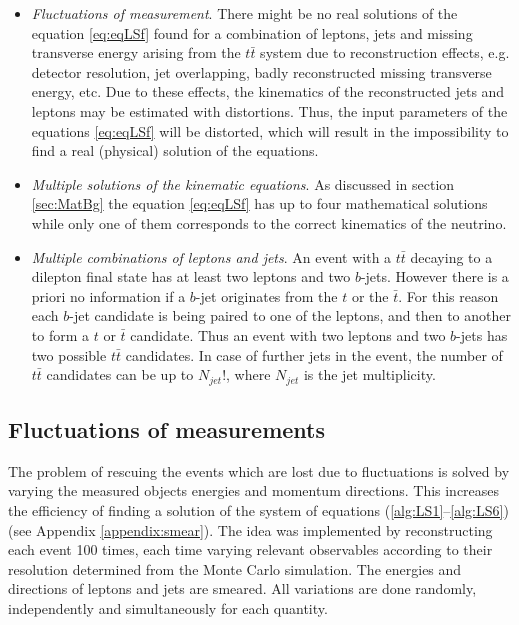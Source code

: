 \begin{itemize}
 \item \textit{Fluctuations of measurement}. There might be no real solutions of the equation \ref{eq:eqLSf} found for a combination
 of leptons, jets and missing transverse energy arising from the $t\bar{t}$ system due to reconstruction effects, e.g. detector resolution,
 jet overlapping, badly reconstructed missing transverse energy, etc. Due to these effects, the kinematics of the reconstructed 
 jets and leptons may be estimated with distortions. Thus, the input parameters of the equations \ref{eq:eqLSf} will be distorted,
 which will result in the impossibility to find a real (physical) solution of the equations.
 \item \textit{Multiple solutions of the kinematic equations}. As discussed in section \ref{sec:MatBg} the equation \ref{eq:eqLSf}
 has up to four mathematical solutions while only one of them corresponds to the correct kinematics of the neutrino.
 \item \textit{Multiple combinations of leptons and jets}. An event with a $t\bar{t}$ decaying to a dilepton final state has at least two leptons and two
 $b$-jets. However there is a priori no information if a $b$-jet originates from the $t$ or the $\bar{t}$. For this reason each $b$-jet candidate is being 
 paired to one of the leptons, and then to another
 to form a $t$ or $\bar{t}$ candidate. Thus an event with two leptons and two $b$-jets has two possible $t\bar{t}$ candidates. In case of further jets
 in the event, the number of $t\bar{t}$ candidates can be up to $N_{jet}!$, where $N_{jet}$ is the jet multiplicity.
\end{itemize}


\subsection{Fluctuations of measurements}\label{ssec:smear}

The problem of rescuing the events which are lost due to fluctuations is solved by varying the measured objects energies and
momentum directions. This increases the efficiency of finding a solution of the system of equations (\ref{alg:LS1}--\ref{alg:LS6}) (see Appendix \ref{appendix:smear}). 
The idea was implemented by reconstructing each event 100 times, each time varying relevant observables according to their resolution determined from the Monte Carlo simulation.
The energies and directions of leptons and jets are smeared. All variations are done randomly, independently and simultaneously for each quantity.

